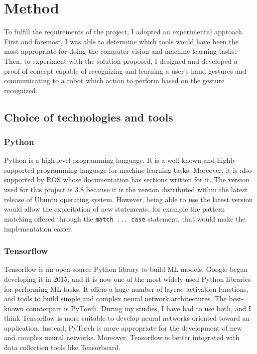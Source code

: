 \documentclass[../thesis.tex]{subfiles}
\begin{document}
\chapter{Method}\label{cap:methods}
To fulfill the requirements of the project, I adopted an experimental approach. First and foremost, I was able to determine which tools would have been the most appropriate for doing the computer vision and machine learning tasks. Then, to experiment with the solution proposed, I designed and developed a proof of concept capable of recognizing and learning a user’s hand gestures and communicating to a robot which action to perform based on the gesture recognized. 
\section{Choice of technologies and tools}\label{sec:technologies_and_tolls}
\subsection{Python}
Python is a high-level programming language. It is a well-known and highly supported programming language for machine learning tasks. Moreover, it is also supported by \acrshort{ROS} whose documentation has sections written for it. The version used for this project is 3.8 because it is the version distributed within the latest release of Ubuntu operating system. However, being able to use the latest version would allow the exploitation of new statements, for example the pattern matching offered through the \texttt{match ... case} statement, that would make the implementation easier.

\subsection{Tensorflow}
Tensorflow is an open-source Python library to build \acrshort{ML} models. Google began developing it in 2015, and it is now one of the most widely-used Python libraries for performing \acrshort{ML} tasks. It offers a huge number of layers, activation functions, and tools to build simple and complex neural network architectures. The best-known counterpart is PyTorch. During my studies, I have had to use both, and I think Tensorflow is more suitable to develop neural networks oriented toward an application. Instead, PyTorch is more appropriate for the development of new and complex neural networks. Moreover, Tensorflow is better integrated with data collection tools like Tensorboard. 
\end{document}
